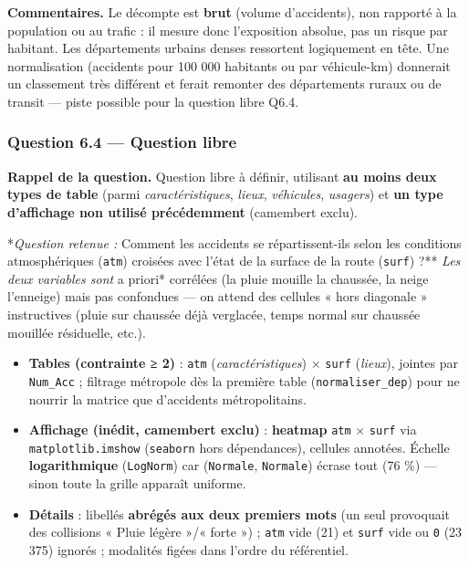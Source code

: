 \documentclass[11pt,a4paper]{article}
\newcommand{\rub}[2]{\textbf{\textcolor{#1}{#2}}}
\begin{document}
\rub{labcomment}{Commentaires.} Le décompte est \textbf{brut} (volume d'accidents), non rapporté à la population ou au trafic : il mesure donc l'exposition absolue, pas un risque par habitant. Les départements urbains denses ressortent logiquement en tête. Une normalisation (accidents pour 100 000 habitants ou par véhicule-km) donnerait un classement très différent et ferait remonter des départements ruraux ou de transit — piste possible pour la question libre Q6.4.

\clearpage
\subsubsection*{Question 6.4 — Question libre}

\rub{labrappel}{Rappel de la question.} Question libre à définir, utilisant \textbf{au moins deux types de table} (parmi \emph{caractéristiques}, \emph{lieux}, \emph{véhicules}, \emph{usagers}) et \textbf{un type d'affichage non utilisé précédemment} (camembert exclu).

*\emph{Question retenue : }Comment les accidents se répartissent-ils selon les conditions atmosphériques (\texttt{atm}) croisées avec l'état de la surface de la route (\texttt{surf}) ?**\emph{ Les deux variables sont }a priori* corrélées (la pluie mouille la chaussée, la neige l'enneige) mais pas confondues — on attend des cellules « hors diagonale » instructives (pluie sur chaussée déjà verglacée, temps normal sur chaussée mouillée résiduelle, etc.).

\begin{agentbox}
\begin{itemize}
\item \textbf{Tables (contrainte ≥ 2)} : \texttt{atm} (\emph{caractéristiques}) × \texttt{surf} (\emph{lieux}), jointes par \texttt{Num\_Acc} ; filtrage métropole dès la première table (\texttt{normaliser\_dep}) pour ne nourrir la matrice que d'accidents métropolitains.
\item \textbf{Affichage (inédit, camembert exclu)} : \textbf{heatmap} \texttt{atm} × \texttt{surf} via \texttt{matplotlib.imshow} (\texttt{seaborn} hors dépendances), cellules annotées. Échelle \textbf{logarithmique} (\texttt{LogNorm}) car (\texttt{Normale}, \texttt{Normale}) écrase tout (76 \%) — sinon toute la grille apparaît uniforme.
\item \textbf{Détails} : libellés \textbf{abrégés aux deux premiers mots} (un seul provoquait des collisions « Pluie légère »/« forte ») ; \texttt{atm} vide (21) et \texttt{surf} vide ou \texttt{0} (23 375) ignorés ; modalités figées dans l'ordre du référentiel.
\end{itemize}
\end{agentbox}
\end{document}
